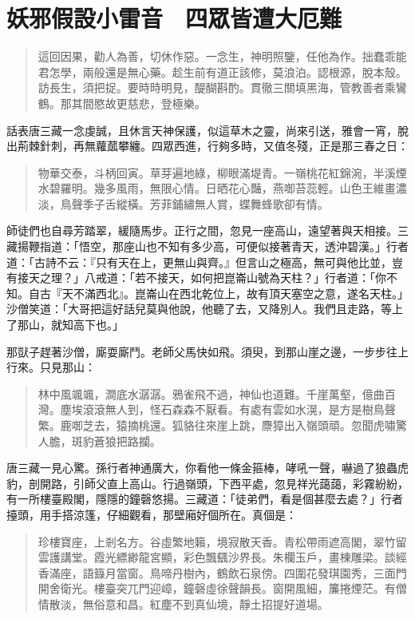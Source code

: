 
\chapter{妖邪假設小雷音　四眾皆遭大厄難}

\begin{quote}
這回因果，勸人為善，切休作惡。一念生，神明照鑒，任他為作。拙蠢乖能君怎學，兩般還是無心藥。趁生前有道正該修，莫浪泊。認根源，脫本殼。訪長生，須把捉。要時時明見，醍醐斟酌。貫徹三關填黑海，管教善者乘鸞鶴。那其間愍故更慈悲，登極樂。
\end{quote}

話表唐三藏一念虔誠，且休言天神保護，似這草木之靈，尚來引送，雅會一宵，脫出荊棘針刺，再無蘿蓏攀纏。四眾西進，行夠多時，又值冬殘，正是那三春之日：
\begin{quote}
物華交泰，斗柄回寅。草芽遍地綠，柳眼滿堤青。一嶺桃花紅錦涴，半溪煙水碧羅明。幾多風雨，無限心情。日晒花心豔，燕啣苔蕊輕。山色王維畫濃淡，鳥聲季子舌縱橫。芳菲鋪繡無人賞，蝶舞蜂歌卻有情。
\end{quote}

師徒們也自尋芳踏翠，緩隨馬步。正行之間，忽見一座高山，遠望著與天相接。三藏揚鞭指道：「悟空，那座山也不知有多少高，可便似接著青天，透沖碧漢。」行者道：「古詩不云：『只有天在上，更無山與齊。』但言山之極高，無可與他比並，豈有接天之理？」八戒道：「若不接天，如何把崑崙山號為天柱？」行者道：「你不知。自古『天不滿西北』。崑崙山在西北乾位上，故有頂天塞空之意，遂名天柱。」沙僧笑道：「大哥把這好話兒莫與他說，他聽了去，又降別人。我們且走路，等上了那山，就知高下也。」

那獃子趕著沙僧，廝耍廝鬥。老師父馬快如飛。須臾，到那山崖之邊，一步步往上行來。只見那山：
\begin{quote}
林中風颯颯，澗底水潺潺。鴉雀飛不過，神仙也道難。千崖萬壑，億曲百灣。塵埃滾滾無人到，怪石森森不厭看。有處有雲如水滉，是方是樹鳥聲繁。鹿啣芝去，猿摘桃還。狐貉往來崖上跳，麖獐出入嶺頭頑。忽聞虎嘯驚人膽，斑豹蒼狼把路攔。
\end{quote}

唐三藏一見心驚。孫行者神通廣大，你看他一條金箍棒，哮吼一聲，嚇過了狼蟲虎豹，剖開路，引師父直上高山。行過嶺頭，下西平處，忽見祥光藹藹，彩霧紛紛，有一所樓臺殿閣，隱隱的鐘磬悠揚。三藏道：「徒弟們，看是個甚麼去處？」行者擡頭，用手搭涼篷，仔細觀看，那壁廂好個所在。真個是：
\begin{quote}
珍樓寶座，上剎名方。谷虛繁地籟，境寂散天香。青松帶雨遮高閣，翠竹留雲護講堂。霞光縹緲龍宮顯，彩色飄颻沙界長。朱欄玉戶，畫棟雕梁。談經香滿座，語籙月當窗。鳥啼丹樹內，鶴飲石泉傍。四圍花發琪園秀，三面門開舍衛光。樓臺突兀門迎嶂，鐘磬虛徐聲韻長。窗開風細，簾捲煙茫。有僧情散淡，無俗意和昌。紅塵不到真仙境，靜土招提好道場。
\end{quote}

